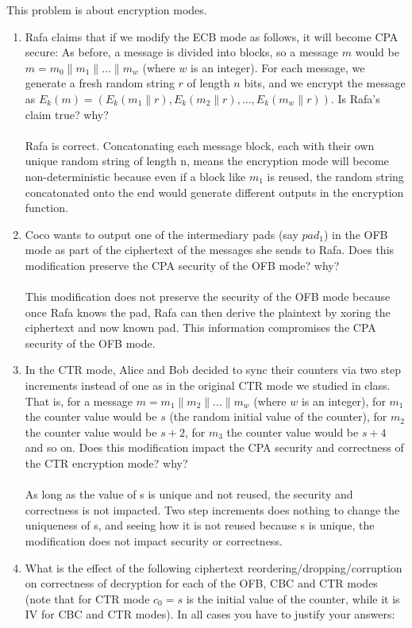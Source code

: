 \documentclass[12pt]{article}
\newcommand*\concat{\mathbin{\|}}
\begin{document}
This problem is about encryption modes.
\begin{enumerate}
\item Rafa claims that if we modify the ECB mode as follows, it will become CPA secure: As before, a message is divided into blocks, so a message $m$ would be $m = m_0 \concat m_1 \concat \dots \concat m_w$ (where $w$ is an integer). For each message, we generate a fresh random string $r$ of length $n$ bits, and we encrypt the message as $E_k(m) = (E_k(m_1 \concat r), E_k(m_2 \concat r), \dots, E_k(m_w \concat r))$. Is Rafa's claim true? why? 
\\\\Rafa is correct. Concatonating each message block, each with their own unique random string of length n, means the
encryption mode will become non-deterministic because even if a block like $m_1$ is reused, the random string concatonated onto
the end would generate different outputs in the encryption function. 
\item Coco wants to output one of the intermediary pads (say $pad_1$) in the OFB mode as part of the ciphertext of the messages she sends to Rafa. Does this modification preserve the CPA security of the OFB mode? why? 
\\\\This modification does not preserve the security of the OFB mode because once Rafa knows the pad, Rafa can then
derive the plaintext by xoring the ciphertext and now known pad. This information compromises the CPA security of the OFB mode. 
\item In the CTR mode, Alice and Bob decided to sync their counters via two step increments instead of one as in the original CTR mode we studied in class. That is, for a message $m = m_1 \concat m_2 \concat \dots \concat m_w$ (where $w$ is an integer), for $m_1$ the counter value would be $s$ (the random initial value of the counter), for $m_2$ the counter value would be $s+2$, for $m_3$ the counter value would be $s+4$ and so on. Does this modification impact the CPA security and correctness of the CTR encryption mode? why?
\\\\As long as the value of s is unique and not reused, the security and correctness is not impacted. Two step increments does
nothing to change the uniqueness of s, and seeing how it is not reused because s is unique, the modification does not impact
security or correctness. 
\item What is the effect of the following ciphertext reordering/dropping/corruption on correctness of decryption for each of the OFB, CBC and CTR modes (note that for CTR mode $c_0 = s$ is the initial value of the counter, while it is IV for CBC and CTR modes). In all cases you have to justify your answers: 

\end{enumerate}
\end{document}
